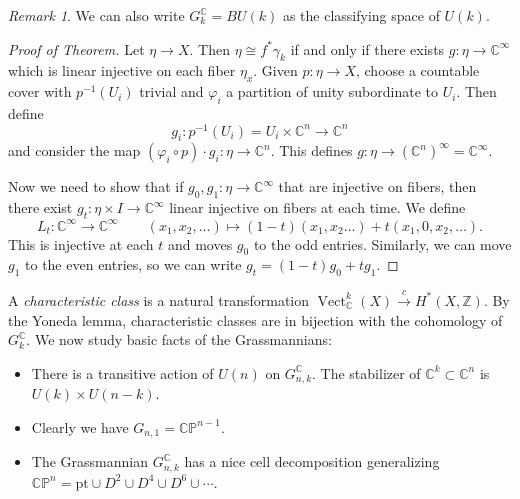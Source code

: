 \documentclass[leqno, openany]{memoir}
\theoremstyle{definition}
\theoremstyle{remark}
\newtheorem{rmk}[thm]{Remark}
\theoremstyle{plain}
\theoremstyle{definition}
\theoremstyle{remark}
\newcommand{\C}{\mathbb{C}}
\newcommand{\Z}{\mathbb{Z}}
\renewcommand{\P}{\mathbb{P}}
\newcommand{\mr}[1]{\mathrm{#1}}
\DeclareMathOperator{\Vect}{Vect}
\begin{document}
\begin{rmk} We can also write $G_k^{\C} = BU(k)$ as the classifying space of
$U(k)$.  \end{rmk}

\begin{proof}[Proof of Theorem] Let $\eta \to X$. Then $\eta \cong f^*
    \gamma_k$ if and only if there exists $g \colon \eta \to \C^{\infty}$ which
    is linear injective on each fiber $\eta_x$. Given $p \colon \eta \to X$,
    choose a countable cover with $p^{-1}(U_i)$ trivial and $\varphi_i$ a
    partition of unity subordinate to $U_i$. Then define \[ g_i \colon
    p^{-1}(U_i) = U_i \times \C^n \to \C^n \] and consider the map $(\varphi_i
    \circ p) \cdot g_i \colon \eta \to \C^n$. This defines $g \colon \eta \to
    {(\C^n)}^{\infty} = \C^{\infty}$.

    Now we need to show that if $g_0, g_1 \colon \eta \to \C^{\infty}$ that are
    injective on fibers, then there exist $g_t \colon \eta \times I \to
    \C^{\infty}$ linear injective on fibers at each time. We define \[ L_t
    \colon \C^{\infty} \to \C^{\infty} \qquad (x_1, x_2, \ldots) \mapsto
(1-t)(x_1, x_2 \ldots) + t (x_1, 0, x_2, \ldots). \] This is injective at each
$t$ and moves $g_0$ to the odd entries. Similarly, we can move $g_1$ to the
even entries, so we can write $g_t = (1-t) g_0 + t g_1$.  \end{proof}

A \textit{characteristic class} is a natural transformation $\Vect_{\C}^k (X)
\xrightarrow{c} H^*(X, \Z)$. By the Yoneda lemma, characteristic classes are in
bijection with the cohomology of $G_k^{\C}$. We now study basic facts of the
Grassmannians: \begin{itemize} \item There is a transitive action of $U(n)$ on
    $G_{n,k}^{\C}$. The stabilizer of $\C^k \subset \C^n$ is $U(k) \times
    U(n-k)$.  \item Clearly we have $G_{n,1} = \C\P^{n-1}$.  \item The
    Grassmannian $G_{n,k}^{\C}$ has a nice cell decomposition generalizing
    $\C\P^n = \mr{pt} \cup D^2 \cup D^4 \cup D^6 \cup \cdots$.  \end{itemize}
\end{document}
